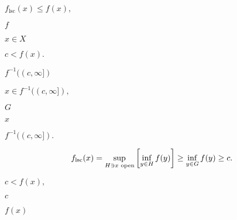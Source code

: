 \documentclass[10pt]{book}
\begin{document}
\begin{mdSnippets}
\begin{mdInlineSnippet}[2a1cb0faeaae36f22fe0e05e9f3b5871]
$f_\text{lsc}(x) \le f(x),$\end{mdInlineSnippet}%
\begin{mdInlineSnippet}%
$f$\end{mdInlineSnippet}%
\begin{mdInlineSnippet}[4202025ca33a0244467654fcec511b07]%
$x \in X$\end{mdInlineSnippet}%
\begin{mdInlineSnippet}[d3c94338406e158dfc775878383b1a9b]%
$c < f(x).$\end{mdInlineSnippet}%
\begin{mdInlineSnippet}[bd9a25206d9dd30b4167e1768fd7f67f]%
$f^{-1}((c, \infty])$\end{mdInlineSnippet}%
\begin{mdInlineSnippet}[d70d6003a14c06326b4596a29101a29f]%
$x \in f^{-1}((c, \infty]),$\end{mdInlineSnippet}%
\begin{mdInlineSnippet}[dfcf28d0734569a6a693bc8194de62bf]%
$G$\end{mdInlineSnippet}%
\begin{mdInlineSnippet}[9dd4e461268c8034f5c8564e155c67a6]%
$x$\end{mdInlineSnippet}%
\begin{mdInlineSnippet}[c5fbacb75fe2e0e55ab12279de6a1911]%
$f^{-1}((c, \infty]).$\end{mdInlineSnippet}%
\begin{mdDisplaySnippet}[9d8aaaba01f3f1f000818ae055bb6e07]%
\[%
f_\text{lsc}(x) = \sup_{H \ni x \text{ open}} \qty[\inf_{y \in H} f(y)]
\ge \inf_{y \in G} f(y) \ge c.
\]%
\end{mdDisplaySnippet}%
\begin{mdInlineSnippet}[0c32250defe8a068e32972d9575867fc]%
$c < f(x),$\end{mdInlineSnippet}%
\begin{mdInlineSnippet}[4a8a08f09d37b73795649038408b5f33]%
$c$\end{mdInlineSnippet}%
\begin{mdInlineSnippet}[50bbd36e1fd2333108437a2ca378be62]%
$f(x)$\end{mdInlineSnippet}%

\end{mdSnippets}
\end{document}
